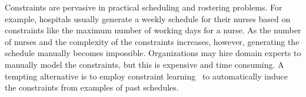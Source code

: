 \documentclass{article}
\newcommand{\stefano}[1]{{\bf \textcolor{violet}{{Stefano: #1}}}}
\begin{document}
%
%



Constraints are pervasive in practical scheduling and rostering problems. For example, hospitals usually generate a weekly schedule for their nurses based on constraints like the maximum number of working days for a nurse. As the number of nurses and the complexity of the constraints increases, however, generating the schedule manually becomes impossible.  Organizations may hire domain experts to manually model the constraints, but this is expensive and time consuming. A tempting alternative is to employ constraint learning~\cite{de2018learning} to automatically induce the constraints from examples of past schedules.
\end{document}
